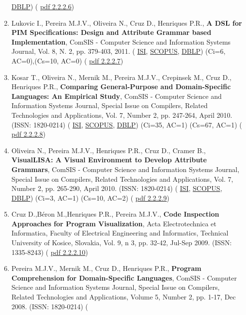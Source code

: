\documentclass[11pt]{article}
\begin{document}
\begin{enumerate}
{\href{run:Publicacoes/ComprovativosDBLP.pdf}{DBLP}) (
\href{run:Publicacoes/RAISE2012.pdf}{pdf 2.2.2.6})}
\item{ Lukovic I., Pereira M.J.V., Oliveira N., Cruz D., Henriques P.R., {
\bf{ A DSL for PIM Specifications: Design and Attribute Grammar based Implementation}}, ComSIS - Computer Science and Information Systems Journal, Vol. 8, N. 2, pp. 379-403, 2011. (
\href{run:Publicacoes/ComprovativosISI.pdf}{ISI}, 
\href{run:Publicacoes/PublicacoesSCOPUS.pdf}{SCOPUS}, 
\href{run:Publicacoes/ComprovativosDBLP.pdf}{DBLP}) (Ci=6, AC=0),(Cs=10, AC=0) (
\href{run:Publicacoes/publicacoes/55.pdf}{pdf 2.2.2.7})}
\item{ Kosar T., Oliveira N., Mernik M., Pereira M.J.V., Crepinsek M., Cruz D., Henriques P.R., {
\bf{ Comparing General-Purpose and Domain-Specific Languages: An Empirical Study}}, ComSIS - Computer Science and Information Systems Journal, Special Issue on Compilers, Related Technologies and Applications, Vol. 7, Number 2, pp. 247-264, April 2010. (ISSN: 1820-0214) (
\href{run:Publicacoes/ComprovativosISI.pdf}{ISI}, 
\href{run:Publicacoes/PublicacoesSCOPUS.pdf}{SCOPUS}, 
\href{run:Publicacoes/ComprovativosDBLP.pdf}{DBLP}) (Ci=35, AC=1) (Cs=67, AC=1) (
\href{run:Publicacoes/publicacoes/49.pdf}{pdf 2.2.2.8})}
\item{ Oliveira N., Pereira M.J.V., Henriques P.R., Cruz D., Cramer B., {
\bf{ VisualLISA: A Visual Environment to Develop Attribute Grammars}}, ComSIS - Computer Science and Information Systems Journal, Special Issue on Compilers, Related Technologies and Applications, Vol. 7, Number 2, pp. 265-290, April 2010. (ISSN: 1820-0214) (
\href{run:Publicacoes/ComprovativosISI.pdf}{ISI}, 
\href{run:Publicacoes/PublicacoesSCOPUS.pdf}{SCOPUS}, 
\href{run:Publicacoes/ComprovativosDBLP.pdf}{DBLP}) (Ci=3, AC=1) (Cs=10, AC=2) (
\href{run:Publicacoes/publicacoes/52.pdf}{pdf 2.2.2.9})}
\item{ Cruz D.,Béron M.,Henriques P.R., Pereira M.J.V., {
\bf{ Code Inspection Approaches for Program Visualization}}, Acta Electrotechnica et Informatica, Faculty of Electrical Engineering and Informatics, Technical University of Kosice, Slovakia, Vol. 9, n 3, pp. 32-42, Jul-Sep 2009. (ISSN: 1335-8243) (
\href{run:Publicacoes/publicacoes/40.pdf}{pdf 2.2.2.10})}
\item{ Pereira M.J.V., Mernik M., Cruz D., Henriques P.R., {
\bf{ Program Comprehension for Domain-Specific Languages}}, ComSIS - Computer Science and Information Systems Journal, Special Issue on Compilers, Related Technologies and Applications, Volume 5, Number 2, pp. 1-17, Dec 2008. (ISSN: 1820-0214) (
}
\end{enumerate}
\end{document}
